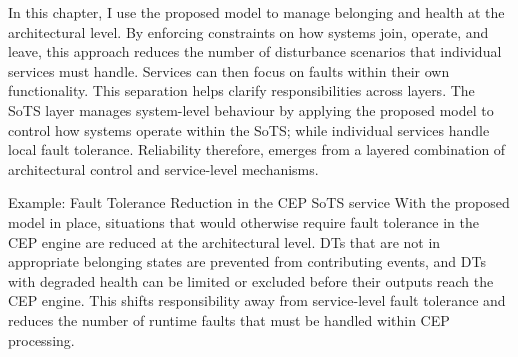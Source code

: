 In this chapter, I use the proposed model to manage belonging and health at the architectural level. By enforcing constraints on how systems join, operate, and leave, this approach reduces the number of disturbance scenarios that individual services must handle. Services can then focus on faults within their own functionality. This separation helps clarify responsibilities across layers. The SoTS layer manages system-level behaviour by applying the proposed model to control how systems operate within the SoTS; while individual services handle local fault tolerance. Reliability therefore, emerges from a layered combination of architectural control and service-level mechanisms.

\begin{runningexample}{Example: Fault Tolerance Reduction in the CEP SoTS service}
With the proposed model in place, situations that would otherwise require fault tolerance in the CEP engine are reduced at the architectural level. DTs that are not in appropriate belonging states are prevented from contributing events, and DTs with degraded health can be limited or excluded before their outputs reach the CEP engine. This shifts responsibility away from service-level fault tolerance and reduces the number of runtime faults that must be handled within CEP processing.
\end{runningexample}
